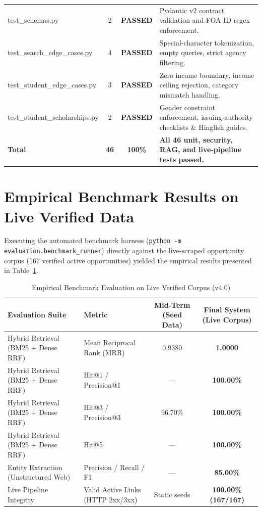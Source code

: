 \documentclass[12pt,a4paper,oneside]{report}
\begin{document}
\begin{table}[htbp]
\begin{tabularx}{\textwidth}{>{\ttfamily}lccX}
        test\_schemas.py & 2 & \textcolor{successColor}{\textbf{PASSED}} & Pydantic v2 contract validation and FOA ID regex enforcement. \\
        test\_search\_edge\_cases.py & 4 & \textcolor{successColor}{\textbf{PASSED}} & Special-character tokenization, empty queries, strict agency filtering. \\
        test\_student\_edge\_cases.py & 3 & \textcolor{successColor}{\textbf{PASSED}} & Zero income boundary, income ceiling rejection, category mismatch handling. \\
        test\_student\_scholarships.py & 2 & \textcolor{successColor}{\textbf{PASSED}} & Gender constraint enforcement, issuing-authority checklists \& Hinglish guides. \\
        \midrule
        \textnormal{\textbf{Total}} & \textbf{46} & \textcolor{successColor}{\textbf{100\%}} & \textbf{All 46 unit, security, RAG, and live-pipeline tests passed.} \\
        \bottomrule
    \end{tabularx}
\end{table}

\section{Empirical Benchmark Results on Live Verified Data}
Executing the automated benchmark harness (\texttt{python -m evaluation.benchmark\_runner}) directly against the live-scraped opportunity corpus (167 verified active opportunities) yielded the empirical results presented in Table~\ref{tab:live_benchmarks}.

\begin{table}[H]
    \centering
    \caption{Empirical Benchmark Evaluation on Live Verified Corpus (v4.0)}
    \label{tab:live_benchmarks}
    \small
    \begin{tabular}{llcc}
        \toprule
        \textbf{Evaluation Suite} & \textbf{Metric} & \textbf{Mid-Term (Seed Data)} & \textbf{Final System (Live Corpus)} \\
        \midrule
        Hybrid Retrieval (BM25 + Dense RRF) & Mean Reciprocal Rank (MRR) & 0.9380 & \textbf{1.0000} \\
        Hybrid Retrieval (BM25 + Dense RRF) & Hit@1 / Precision@1 & --- & \textbf{100.00\%} \\
        Hybrid Retrieval (BM25 + Dense RRF) & Hit@3 / Precision@3 & 96.70\% & \textbf{100.00\%} \\
        Hybrid Retrieval (BM25 + Dense RRF) & Hit@5 & --- & \textbf{100.00\%} \\
        Entity Extraction (Unstructured Web) & Precision / Recall / F1 & --- & \textbf{85.00\%} \\
        Live Pipeline Integrity & Valid Active Links (HTTP 2xx/3xx) & Static seeds & \textbf{100.00\% (167/167)} \\
        \bottomrule
    \end{tabular}
\end{table}
\end{document}
